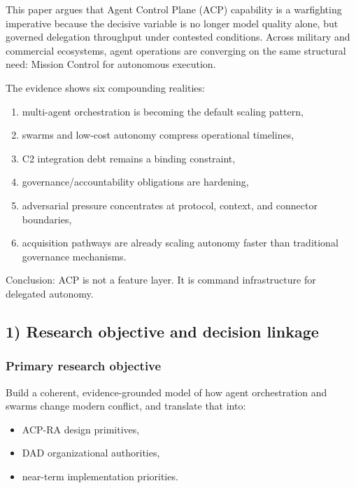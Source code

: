 \documentclass[11pt]{article}
\begin{document}
This paper argues that Agent Control Plane (ACP) capability is a
warfighting imperative because the decisive variable is no longer model
quality alone, but governed delegation throughput under contested
conditions. Across military and commercial ecosystems, agent operations
are converging on the same structural need: Mission Control for
autonomous execution.

The evidence shows six compounding realities:

\begin{enumerate}
\def\labelenumi{\arabic{enumi}.}
\tightlist
\item
  multi-agent orchestration is becoming the default scaling pattern,
\item
  swarms and low-cost autonomy compress operational timelines,
\item
  C2 integration debt remains a binding constraint,
\item
  governance/accountability obligations are hardening,
\item
  adversarial pressure concentrates at protocol, context, and connector
  boundaries,
\item
  acquisition pathways are already scaling autonomy faster than
  traditional governance mechanisms.
\end{enumerate}

Conclusion: ACP is not a feature layer. It is command infrastructure for
delegated autonomy.

\hypertarget{research-objective-and-decision-linkage}{%
\subsection{1) Research objective and decision
linkage}\label{research-objective-and-decision-linkage}}

\hypertarget{primary-research-objective}{%
\subsubsection{Primary research
objective}\label{primary-research-objective}}

Build a coherent, evidence-grounded model of how agent orchestration and
swarms change modern conflict, and translate that into:

\begin{itemize}
\tightlist
\item
  ACP-RA design primitives,
\item
  DAD organizational authorities,
\item
  near-term implementation priorities.
\end{itemize}
\end{document}
